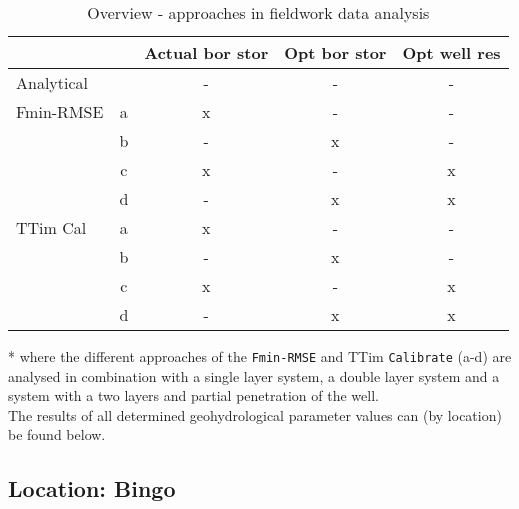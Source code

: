 \begin{table}[h!]
\small
\centering
\caption{Overview - approaches in fieldwork data analysis}
\label{tab:overview_table}
\begin{tabular}{l|c|c|c|c}
\hline 
\textbf{}                 & \textbf{}        & \textbf{Actual bor stor} & \textbf{Opt bor stor} & \textbf{Opt well res}   \\ \hline \hline
Analytical                &                  & -                        & -                     & -          \\ \hline
Fmin-RMSE                 & a                & x                        & -                     & -          \\
                          & b                & -                        & x                     & -          \\
                          & c                & x                        & -                     & x          \\
                          & d                & -                        & x                     & x          \\ \hline
TTim Cal                  & a                & x                        & -                     & -          \\
                          & b                & -                        & x                     & -          \\
                          & c                & x                        & -                     & x          \\
                          & d                & -                        & x                     & x          \\ \hline    
\end{tabular}
\end{table}
* where the different approaches of the \texttt{Fmin-RMSE} and TTim \texttt{Calibrate} (a-d) are analysed in combination with a single layer system, a double layer system and a system with a two layers and partial penetration of the well. \\

The results of all determined geohydrological parameter values can (by location) be found below. 

\clearpage\subsection{Location: Bingo}
\label{subsec:Bingo_overview}

